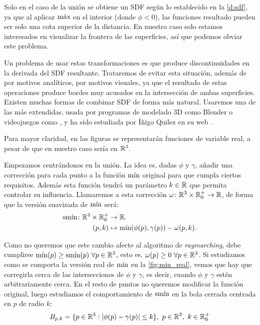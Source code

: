 \begin{observacion}
    Solo en el caso de la unión se obtiene un SDF según lo establecido en la \autoref{d:sdf}, ya que al aplicar $\Max$ en el interior (donde $\phi < 0$), las funciones resultado pueden ser solo una cota superior de la distancia. En nuestro caso solo estamos interesados en visualizar la frontera de las superficies, así que podemos obviar este problema.
\end{observacion}

Un problema de usar estas transformaciones es que produce discontinuidades en la derivada del SDF resultante. Trataremos de evitar esta situación, además de por motivos analíticos, por motivos visuales, ya que el resultado de estas operaciones produce bordes muy acusados en la intersección de ambas superficies. Existen muchas formas de combinar SDF de forma más natural. Usaremos una de las más extendidas, usada por programas de modelado 3D como Blender \cite{repo:blender} o videojuegos como \cite{game:dreams}, y ha sido estudiada por Íñigo Quilez en su web \cite{article:smooth}.

\begin{observacion}
    Para mayor claridad, en las figuras se representarán funciones de variable real, a pesar de que en nuestro caso sería en $\R^3$.
\end{observacion}

Empezamos centrándonos en la unión. La idea es, dadas $\phi$ y $\gamma$, añadir una corrección para cada punto a la función $\Min$ original para que cumpla ciertos requisitos. Además esta función tendrá un parámetro $k\in\R$ que permita controlar su influencia. Llamaremos a esta corrección $\omega\colon \R^3\times \R^+_0\to\R$, de forma que la versión suavizada de $\Min$ será:
\begin{align*}
          \smin\colon \R^3\times \R^+_0 &\to \R.\\
          (p,k) &\mapsto \Min(\phi(p),\gamma(p)) - \omega(p,k).
    \end{align*}

Como no queremos que este cambio afecte al algoritmo de \textit{raymarching}, debe cumplirse $\Min(p)\ge \smin(p) \ \forall p \in \R^3$, esto es, $\omega(p)\ge 0\ \forall p \in \R^3$. 
Si estudiamos como se comporta la versión real de $\Min$ en la \autoref{fig:min_real}, vemos que hay que corregirla cerca de las intersecciones de $\phi$ y $\gamma$, es decir, cuando $\phi$ y $\gamma$ estén arbitrariamente cerca. En el resto de puntos no queremos modificar la función original, luego estudiamos el comportamiento de $\smin$ en la bola cerrada centrada en $p$ de radio $k$:
\begin{equation*}
    B_{p,k} = \{p\in\R^3 : |\phi(p)-\gamma(p)| \le k\}, \ p\in \R^3,\ k\in\R^+_0
\end{equation*}

